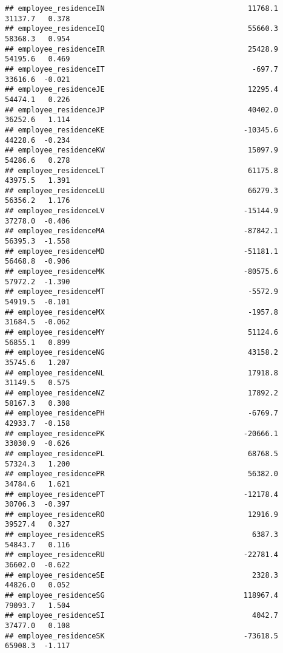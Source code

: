 \documentclass[
]{article}
\begin{document}
\begin{verbatim}
## employee_residenceIN                                 11768.1    31137.7   0.378
## employee_residenceIQ                                 55660.3    58368.3   0.954
## employee_residenceIR                                 25428.9    54195.6   0.469
## employee_residenceIT                                  -697.7    33616.6  -0.021
## employee_residenceJE                                 12295.4    54474.1   0.226
## employee_residenceJP                                 40402.0    36252.6   1.114
## employee_residenceKE                                -10345.6    44228.6  -0.234
## employee_residenceKW                                 15097.9    54286.6   0.278
## employee_residenceLT                                 61175.8    43975.5   1.391
## employee_residenceLU                                 66279.3    56356.2   1.176
## employee_residenceLV                                -15144.9    37278.0  -0.406
## employee_residenceMA                                -87842.1    56395.3  -1.558
## employee_residenceMD                                -51181.1    56468.8  -0.906
## employee_residenceMK                                -80575.6    57972.2  -1.390
## employee_residenceMT                                 -5572.9    54919.5  -0.101
## employee_residenceMX                                 -1957.8    31684.5  -0.062
## employee_residenceMY                                 51124.6    56855.1   0.899
## employee_residenceNG                                 43158.2    35745.6   1.207
## employee_residenceNL                                 17918.8    31149.5   0.575
## employee_residenceNZ                                 17892.2    58167.3   0.308
## employee_residencePH                                 -6769.7    42933.7  -0.158
## employee_residencePK                                -20666.1    33030.9  -0.626
## employee_residencePL                                 68768.5    57324.3   1.200
## employee_residencePR                                 56382.0    34784.6   1.621
## employee_residencePT                                -12178.4    30706.3  -0.397
## employee_residenceRO                                 12916.9    39527.4   0.327
## employee_residenceRS                                  6387.3    54843.7   0.116
## employee_residenceRU                                -22781.4    36602.0  -0.622
## employee_residenceSE                                  2328.3    44826.0   0.052
## employee_residenceSG                                118967.4    79093.7   1.504
## employee_residenceSI                                  4042.7    37477.0   0.108
## employee_residenceSK                                -73618.5    65908.3  -1.117

\end{verbatim}
\end{document}
